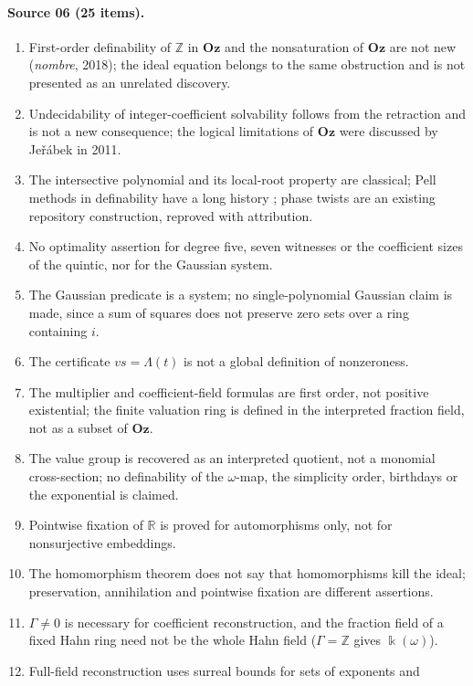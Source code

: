 \documentclass[11pt,oneside]{article}
\numberwithin{equation}{section}
\theoremstyle{definition}
\theoremstyle{remark}
\newcommand{\Oz}{\mathbf{Oz}}
\newcommand{\Z}{\mathbb Z}
\newcommand{\R}{\mathbb R}
\begin{document}
\paragraph{Source 06 (25 items).}
\begin{enumerate}[leftmargin=*,itemsep=1pt]
\item First-order definability of $\Z$ in $\Oz$ and the nonsaturation of $\Oz$
are not new (\emph{nombre}, 2018); the ideal equation belongs to the same
obstruction and is not presented as an unrelated discovery.
\item Undecidability of integer-coefficient solvability follows from the
retraction and is not a new consequence; the logical limitations of $\Oz$
were discussed by Je\v r\'abek in 2011.
\item The intersective polynomial and its local-root property are classical;
Pell methods in definability have a long history \cite{Davis,Denef}; phase twists
are an existing repository construction, reproved with attribution.
\item No optimality assertion for degree five, seven witnesses or the
coefficient sizes of the quintic, nor for the Gaussian system.
\item The Gaussian predicate is a system; no single-polynomial Gaussian claim
is made, since a sum of squares does not preserve zero sets over a ring
containing $i$.
\item The certificate $vs=\Lambda(t)$ is not a global definition of
nonzeroness.
\item The multiplier and coefficient-field formulas are first order, not
positive existential; the finite valuation ring is defined in the interpreted
fraction field, not as a subset of $\Oz$.
\item The value group is recovered as an interpreted quotient, not a monomial
cross-section; no definability of the $\omega$-map, the simplicity order,
birthdays or the exponential is claimed.
\item Pointwise fixation of $\R$ is proved for automorphisms only, not for
nonsurjective embeddings.
\item The homomorphism theorem does not say that homomorphisms kill the ideal;
preservation, annihilation and pointwise fixation are different assertions.
\item $\Gamma\ne0$ is necessary for coefficient reconstruction, and the
fraction field of a fixed Hahn ring need not be the whole Hahn field
($\Gamma=\Z$ gives $\Bbbk(\omega)$).
\item Full-field reconstruction uses surreal bounds for sets of exponents and

\end{enumerate}
\end{document}
